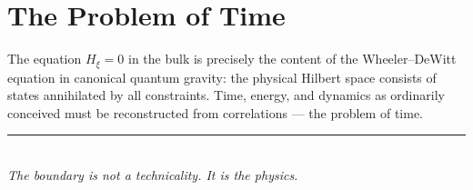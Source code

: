 \documentclass[12pt]{article}
\newcommand{\blueheading}[1]{\textcolor{sectionblue}{#1}}
\begin{document}
\section{\blueheading{The Problem of Time}}

The equation $H_{\xi}=0$ in the bulk is precisely the content of the Wheeler--DeWitt equation in canonical quantum gravity: the physical Hilbert space consists of states annihilated by all constraints. Time, energy, and dynamics as ordinarily conceived must be reconstructed from correlations --- the problem of time.

\begin{center}
\vspace{1em}
\rule{0.85\linewidth}{0.4pt}\\[0.8em]
\Large\textit{The boundary is not a technicality. It is the physics.}
\end{center}
\end{document}
